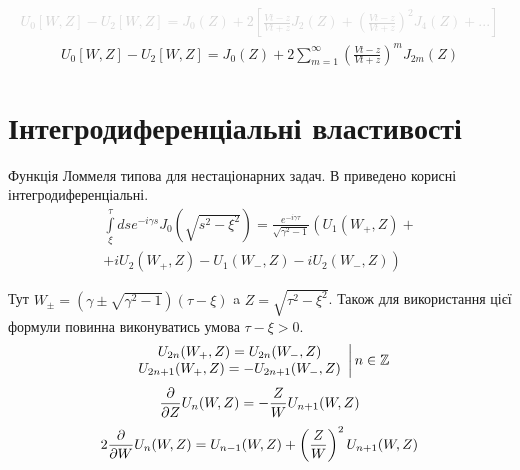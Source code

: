 %
\textcolor{lightgray}{ \begin{equation*} \begin{aligned}
U_0 [W, Z] - U_2 [W, Z] = J_0(Z) + 2 \left[ 
\frac{\mathit{V}t - z}{\mathit{V}t + z} J_2(Z) + \left( 
\frac{\mathit{V}t - z}{\mathit{V}t + z} \right)^2 J_4(Z) + ... \right]
\end{aligned} \end{equation*} }
%
\begin{equation} \begin{aligned}
U_0 [W, Z] - U_2 [W, Z] = J_0(Z) + 2 \sum_{m=1}^{\infty} \left( 
\frac{\mathit{V}t - z}{\mathit{V}t + z} \right)^m J_{2m} (Z)
\end{aligned} \end{equation}

\section{Інтегродиференціальні властивості}

Функція Ломмеля типова для нестаціонарних задач. В \cite[ст. 41]{Borisov1991} 
приведено корисні інтегродиференціальні.
%
\begin{equation} \begin{aligned}
\int \limits_{\xi}^{\tau} ds e^{-i \gamma s} J_0(\sqrt{s^2 - \xi^2 }) = 
\frac{e^{-i \gamma \tau}}{\sqrt{\gamma^2 - 1}} \left( U_1(W_+,Z) + \right. \\ 
\left. + i U_2(W_+,Z) - U_1(W_-,Z) - i U_2(W_-,Z) \right)
\end{aligned} \end{equation}

Тут $ W_\pm = (\gamma \pm \sqrt{\gamma^2 - 1}) (\tau - \xi) $ a 
$ Z = \sqrt{\tau^2 - \xi^2} $. Також для використання цієї формули повинна
виконуватись умова $ \tau - \xi > 0 $.
%
\textcolor{red}{ \begin{equation}
\left. \begin{array}{c}
U_{2n} (W_+, Z) = U_{2n} (W_-, Z) \\
U_{2n+1} (W_+, Z) = - U_{2n+1} (W_-, Z)
\end{array} \right| n \in \mathbb{Z}
\end{equation} }
%
\begin{equation} 
\frac{\partial }{\partial Z} U_n (W,Z) = - \frac{Z}{W} U_{n+1} (W,Z)
\end{equation}
%
\begin{equation}
2 \frac{\partial }{\partial W} U_n (W,Z) = U_{n-1} (W,Z) + 
\left( \frac{Z}{W} \right)^2 U_{n+1} (W,Z)
\end{equation}

